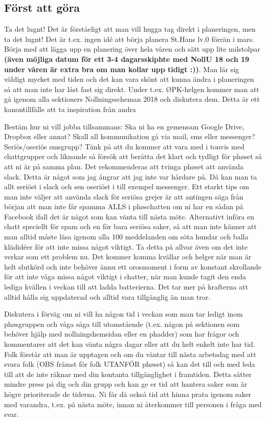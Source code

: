 \documentclass[10pt]{article}
\begin{document}
    \subsection{Först att göra}
    Ta det lugnt! Det är förståeligt att man vill hugga tag direkt i planeringen, men ta det lugnt! Det är t.ex. ingen idé att börja planera St.Hans lv.0 förrän i mars. Börja med att lägga upp en planering över hela våren och sätt upp lite milstolpar \textbf{(även möjliga datum för ett 3-4 dagarsskiphte med NollU 18 och 19 under våren är extra bra om man kollar upp tidigt :))}.  Man lär sig väldigt mycket med tiden och det kan vara skönt att kunna ändra i planeringen så att man inte har låst fast sig direkt. Under t.ex. ØPK-helgen kommer man att gå igenom alla sektioners Nollningsscheman 2018 och diskutera dem. Detta är ett kanontillfälle att ta inspiration från andra

    Bestäm hur ni vill jobba tillsammans: Ska ni ha en gemensam Google Drive, Dropbox eller annat? Skall all kommunikation gå via mail, sms eller messenger? Seriös/oseriös smsgrupp? Tänk på att du kommer att vara med i tonvis med chattgrupper och liknande så försök att berätta det klart och tydligt för phøset så att ni är på samma plan. Det rekommenderas att tvinga phøset att använda slack. Detta är något som jag ångrar att jag inte var hårdare på. Då kan man ta allt seriöst i slack och sen oseriöst i till exempel messenger. Ett starkt tips om man inte väljer att använda slack för seriösa grejer är att antingen säga från början att man inte får spamma ALLS i phøschatten om ni har en sådan på Facebook ifall det är något som kan vänta till nästa möte. Alternativt införa en chatt speciellt för spam och en för bara seriösa saker, så att man inte känner att man alltid måste läsa igenom alla 100 meddelanden om söta hundar och balla klädidéer för att inte missa något viktigt. Ta detta på allvar även om det inte verkar som ett problem nu. Det kommer komma kvällar och helger när man är helt slutkörd och inte behöver ännu ett orosmoment i form av konstant skrollande för att inte våga missa något viktigt i chatter, när man kunde tagit den enda lediga kvällen i veckan till att ladda batterierna. Det tar mer på krafterna att alltid hålla sig uppdaterad och alltid vara tillgänglig än man tror.

    Diskutera i förväg om ni vill ha någon tid i veckan som man tar ledigt inom phøsgruppen och våga säga till utomstående (t.ex. någon på sektionen som behöver hjälp med nollningshemsidan eller en phadder) som har frågor och kommentarer att det kan vänta några dagar eller att du helt enkelt inte har tid. Folk förstår att man är upptagen och om du väntar till nästa arbetsdag med att  svara folk (OBS främst för folk UTANFÖR phøset) så kan det till och med leda till att de inte räknar med din kontanta tillgänglighet i framtiden. Detta sätter mindre press på dig och din grupp och kan ge er tid att hantera saker som är högre prioriterade de tiderna. Ni får då också tid att hinna prata igenom saker med varandra, t.ex. på nästa möte, innan ni återkommer till personen i fråga med svar.
\end{document}
